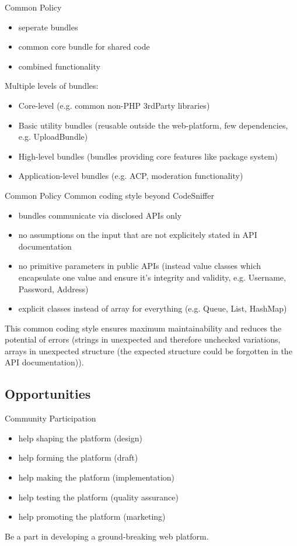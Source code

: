 \documentclass{beamer}
\begin{document}
	\begin{frame}{Common Policy}
		\begin{itemize}
			\item seperate bundles
			\item common core bundle for shared code
			\item combined functionality
		\end{itemize}
		
		Multiple levels of bundles:
		\begin{itemize}
			\item Core-level (e.g. common non-PHP 3rdParty libraries)
			\item Basic utility bundles (reusable outside the web-platform, few dependencies, e.g. UploadBundle)
			\item High-level bundles (bundles providing core features like package system)
			\item Application-level bundles (e.g. ACP, moderation functionality) 
		\end{itemize}
	\end{frame}
	
	\begin{frame}{Common Policy}
		Common coding style beyond CodeSniffer
		\begin{itemize}
			\item bundles communicate via disclosed APIs only
			\item no assumptions on the input that are not explicitely stated in API documentation
			\item no primitive parameters in public APIs (instead value classes which encapsulate one value and ensure it's integrity and validity, e.g. Username, Password, Address)
			\item explicit classes instead of array for everything (e.g. Queue, List, HashMap)
		\end{itemize}
		This common coding style ensures maximum maintainability and reduces the potential of errors (strings in unexpected and therefore unchecked variations, arrays in unexpected structure (the expected structure could be forgotten in the API documentation)).
	\end{frame}
	
	\subsection{Opportunities}
	
	\begin{frame}{Community}
		Participation
		\begin{itemize}
			\item help shaping the platform (design)
			\item help forming the platform (draft)
			\item help making the platform (implementation)
			\item help testing the platform (quality assurance)
			\item help promoting the platform (marketing)
		\end{itemize}
		
		Be a part in developing a ground-breaking web platform.
	\end{frame}
	
\end{document}
